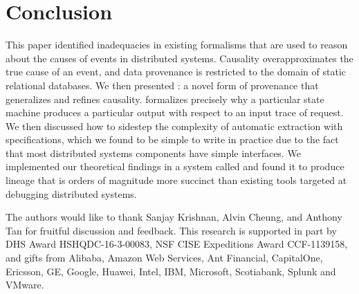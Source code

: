 

\section{Conclusion}
This paper identified inadequacies in existing formalisms that are used to
reason about the causes of events in distributed systems. Causality
overapproximates the true cause of an event, and data provenance is restricted
to the domain of static relational databases.  We then presented
\watprovenance{}: a novel form of provenance that generalizes \whyprovenance{}
and refines causality. \Watprovenance{} formalizes precisely why a particular
state machine produces a particular output with respect to an input trace of
request. We then discussed how to sidestep the complexity of automatic
\watprovenance{} extraction with \watprovenance{} specifications, which we
found to be simple to write in practice due to the fact that most distributed
systems components have simple interfaces. We implemented our theoretical
findings in a system called \fluent{} and found it to produce lineage that is
orders of magnitude more succinct than existing tools targeted at debugging
distributed systems.

\begin{acks}
  The authors would like to thank Sanjay Krishnan, Alvin Cheung, and Anthony
  Tan for fruitful discussion and feedback.
  This research is supported in part by DHS Award HSHQDC-16-3-00083, NSF CISE
  Expeditions Award CCF-1139158, and gifts from Alibaba, Amazon Web Services, Ant
  Financial, CapitalOne, Ericsson, GE, Google, Huawei, Intel, IBM, Microsoft,
  Scotiabank, Splunk and VMware.
\end{acks}

